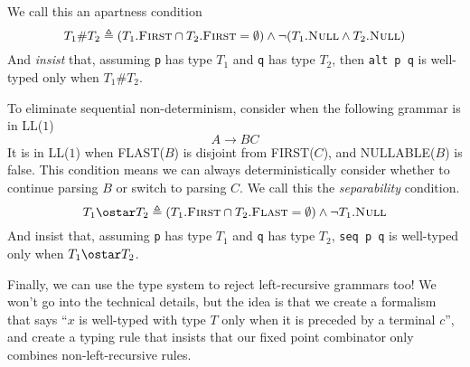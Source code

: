 We call this an apartness condition
\[
T_1 \# T_2 \triangleq (T_1.\textsc{First} \cap T_2.\textsc{First} = \emptyset) \land \neg (T_1.\textsc{Null} \land T_2.\textsc{Null})
\]
And \textit{insist} that, assuming \texttt{p} has type $T_1$ and \texttt{q} has type $T_2$, then \texttt{alt p q} is well-typed only when $T_1 \# T_2$.

To eliminate sequential non-determinism, consider when the following grammar is in LL($1$)
\[A\to BC\]
It is in LL($1$) when \textsf{FLAST}($B$) is disjoint from \textsf{FIRST}($C$), and \textsf{NULLABLE}($B$) is false. This condition means we can always deterministically consider whether to continue parsing $B$ or switch to parsing $C$. We call this the \textit{separability} condition.
\[
T_1 \ostar T_2 \triangleq (T_1.\textsc{First} \cap T_2.\textsc{Flast} = \emptyset) \land \neg T_1.\textsc{Null}
\]
And insist that, assuming \texttt{p} has type $T_1$ and \texttt{q} has type $T_2$, \texttt{seq p q} is well-typed only when $T_1 \ostar T_2$.

Finally, we can use the type system to reject left-recursive grammars too! We won't go into the technical details, but the idea is that we create a formalism that says ``$x$ is well-typed with type $T$ only when it is preceded by a terminal $c$'', and create a typing rule that insists that our fixed point combinator only combines non-left-recursive rules.